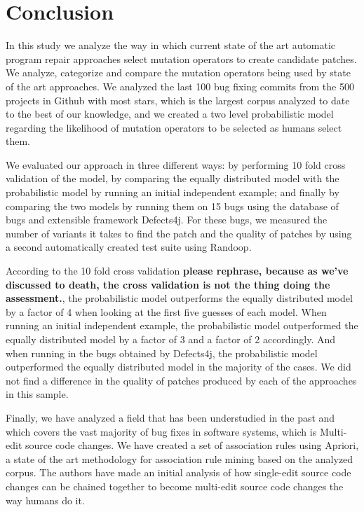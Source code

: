 \documentclass[conference]{IEEEtran}
\newcommand{\todo}[1]
  {{\scriptsize \textbf{\color{red} {#1}}}}
\begin{document}
\section{Conclusion} \label{conclusion}

In this study we analyze the way in which current state of the art automatic 
program repair approaches select mutation operators to create candidate 
patches. We analyze, categorize and compare the mutation operators being used by 
state of the art approaches. We analyzed the last 100 bug fixing commits from the
500 projects in Github with most stars, which is the largest corpus analyzed to date
to the best of our knowledge, and we created a two level probabilistic model regarding 
the likelihood of mutation operators to be selected as humans select them.

We evaluated our approach in three different ways: by performing 10 fold cross 
validation of the model, by comparing the equally distributed model with the probabilistic model by running an initial independent example; and finally by  comparing the two models by running them on 15 bugs using the database of bugs and extensible 
framework Defects4j. For these bugs, we measured the number of variants it takes to find the patch and the quality of patches by using a second automatically created test suite using Randoop. 

According to the 10 fold cross validation\todo{please rephrase, because as we've
  discussed to death, the cross validation is not the thing doing the assessment.}, the probabilistic model outperforms
the equally distributed model by a factor of 4 when looking at the first five
guesses of each model. When running an initial independent example, the
probabilistic model outperformed the equally distributed model by a factor of 3
and a factor of 2 accordingly. And when running in the bugs obtained by
Defects4j, the probabilistic model outperformed the equally distributed model in
the majority of the cases. We did not find a difference in the quality of
patches produced by each of the approaches in this sample. 

Finally, we have analyzed a field that has been understudied in the past and which covers 
the vast majority of bug fixes in software systems, which is Multi-edit source code changes. 
We have created a set of association rules using Apriori, a state of the art
methodology for association rule mining based on the analyzed corpus. The authors have
made an initial analysis of how single-edit source code changes can be chained together 
to become multi-edit source code changes the way humans do it.
\end{document}
